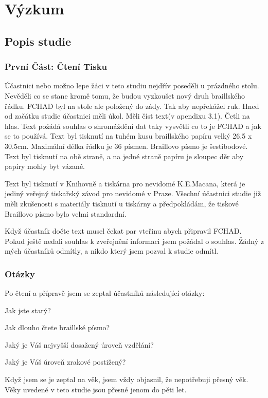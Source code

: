 \chapter{Výzkum}

\section{Popis studie}

\subsection{První Část: Čtení Tisku}

Účastnici nebo možno lepe žáci v teto studiu nejdřív poseděli u prázdného stolu.  Nevěděli co se stane kromě tomu, že budou vyzkoušet nový druh braillského řádku.  FCHAD byl na stole ale položený do zády. Tak aby nepřekážel ruk.  Hned od začátku studie účastnici měli úkol.  Měli číst text(v apendixu 3.1).  Četli na hlas. Text požádá souhlas o shromáždění dat taky vysvětli co to je FCHAD a jak se to používá. Text byl tisknutí na tuhém kusu braillského papíru velký 26.5 x 30.5cm.  Maximální délka řádku je 36 písmen.  Braillovo písmo je šestibodové.  Text byl tisknutí na obě straně, a na jedné straně papíru je sloupec děr aby papíry mohly byt vázané.

Text byl tisknutí v Knihovně a tiskárna pro nevidomé K.E.Macana, která je jediný veřejný tiskařský závod pro nevidomé v Praze.  Všechní účastnici studie již měli zkušenosti s materiály tisknutí u tiskárny a předpokládám, že tiskové Braillovo písmo bylo velmi standardní.

Když účastník dočte text musel čekat par vteřinu abych připravil FCHAD. Pokud ještě nedali souhlas k zveřejnění informaci jsem požádal o souhlas.  Žádný z mých účastníků odmítly, a nikdo který jsem pozval k studie odmítl.

\subsection{Otázky}

Po čtení a přípravě jsem se zeptal účastníků následující otázky:

Jak jste starý?

Jak dlouho čtete braillské písmo?

Jaký je Váš nejvyšší dosažený úroveň vzdělání?

Jaký je Váš úroveň zrakové postižený?

Když jsem se je zeptal na věk, jsem vždy objasnil, že nepotřebuji přesný věk.  Věky uvedené v teto studie jsou přesné jenom do pěti let.

